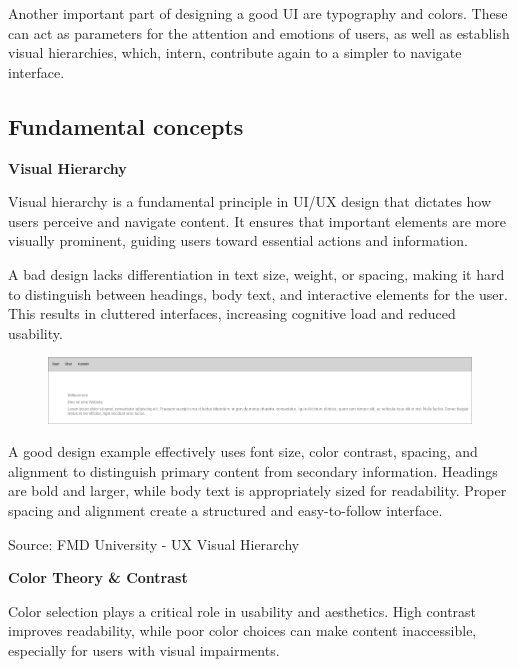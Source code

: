 \blankLine

Another important part of designing a good UI are typography and colors. These
can act as parameters for the attention and emotions of users, as well as establish visual hierarchies, which, intern, contribute again to a simpler to navigate interface. 

\autocite{Paul:UIUXIntroduction}

\subsection{Fundamental concepts}

\textbf{Visual Hierarchy}

Visual hierarchy is a fundamental principle in UI/UX design that dictates how users perceive and navigate content. It ensures that important elements are more visually prominent, guiding users toward essential actions and information.

A bad design lacks differentiation in text size, weight, or spacing, making it hard to distinguish between headings, body text, and interactive elements for the user. This results in cluttered interfaces, increasing cognitive load and reduced usability.

\begin{figure} [H]
    \includegraphics [width=1\textwidth] {images/paul/usabilityExamples/badVisualHierarchy.png}
    \caption{}
\end{figure}

A good design example effectively uses font size, color contrast, spacing, and alignment to distinguish primary content from secondary information. Headings are bold and larger, while body text is appropriately sized for readability. Proper spacing and alignment create a structured and easy-to-follow interface.

Source: FMD University - UX Visual Hierarchy

\blankLine

\textbf{Color Theory \& Contrast}

Color selection plays a critical role in usability and aesthetics. High contrast improves readability, while poor color choices can make content inaccessible, especially for users with visual impairments.

